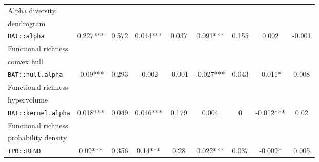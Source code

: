 \documentclass[12pt,letterpaper]{article}
\begin{document}
\begin{landscape}
\begin{table}
\begin{tabular}[t]{l|c|c|c|c|c|c|c|c}
\hline
Alpha diversity\\dendrogram\\ \texttt{BAT::alpha} & 0.227*** & 0.572 & 0.044*** & 0.037 & 0.091*** & 0.155 & 0.002 & -0.001\\
\hline
Functional richness\\convex hull\\ \texttt{BAT::hull.alpha} & -0.09*** & 0.293 & -0.002 & -0.001 & -0.027*** & 0.043 & -0.011* & 0.008\\
\hline
Functional richness\\hypervolume\\ \texttt{BAT::kernel.alpha} & 0.018*** & 0.049 & 0.046*** & 0.179 & 0.004 & 0 & -0.012*** & 0.02\\
\hline
Functional richness\\probability density\\ \texttt{TPD::REND} & 0.09*** & 0.356 & 0.14*** & 0.28 & 0.022*** & 0.037 & -0.009* & 0.005\\
\hline
\end{tabular}
\end{table}
\end{landscape}
\end{document}
